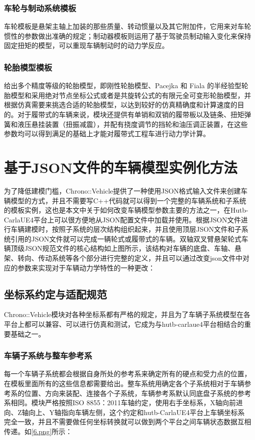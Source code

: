 \subsubsection{车轮与制动系统模板}

车轮模板是悬架主轴上加装的那些质量、转动惯量以及其它附加件，它用来对车轮惯性的参数做出准确的规定；制动器模板则运用了基于驾驶员制动输入变化来保持固定扭矩的模型，可以重现车辆制动时的动力学反应\cite{guo2025pid}。

\subsubsection{轮胎模型模板}

给出多个精度等级的轮胎模型，即刚性轮胎模型、Pacejka 和 Fiala 的半经验型轮胎模型和采用绝对节点坐标公式或者是共旋转公式的有限元全可变形轮胎模型，并根据仿真需要来挑选合适的轮胎模型，以达到较好的仿真精确度和计算速度的目的。对于履带式的车辆来说，模块还提供有单销和双销的履带板以及链条、扭矩弹簧和液压悬挂装置（扭振减震），并配有挠度调节的挡轮和油压调正装置，在这些参数均可以得到满足的基础上才能对履带式工程车进行动力学计算。

\section{基于JSON文件的车辆模型实例化方法}

为了降低建模门槛，Chrono::Vehicle提供了一种使用JSON格式输入文件来创建车辆模型的方式，并且不需要写C++代码就可以得到一个完整的车辆系统和子系统的模板实例，这也是本文中关于如何改变车辆模型参数主要的方法之一，在Hutb-CarlaUE4平台上可以很方便地从JSON配置文件中加载并使用。根据JSON文件进行车辆建模时，按照子系统的层次结构组织起来，并且使用顶层JSON文件和子系统引用的JSON文件就可以完成一辆轮式或履带式的车辆。双轴双叉臂悬架轮式车辆顶级JSON规范文件的核心结构如上图所示，该结构对车辆的底盘、车轴、悬架、转向、传动系统等各个部分进行完整的定义，并且可以通过改变json文件中对应的参数来实现对于车辆动力学特性的一种更改：

\subsection{坐标系约定与适配规范}

Chrono::Vehicle模块对各种坐标系都有严格的规定，并且为了车辆子系统模型在各平台上都可以兼容、可以进行仿真和测试，它成为与hutb-carlaue4平台相结合的重要基础之一。

\subsubsection{车辆子系统与整车参考系}
每一个车辆子系统都会根据自身所处的参考系来确定所有的硬点和受力点的位置，在模板里面所有的这些信息都需要给出。整车系统用确定各个子系统相对于车辆参考系的位置、方向来装配、连接各个子系统，车辆参考系默认同底盘子系统的参考系相同。模块严格按照ISO 8855：2011车轴约定，使用右手坐标系，X轴向前进向、Z轴向上、Y轴指向车辆左侧，这个约定和hutb-CarlaUE4平台上车辆坐标系完全一致，并且不需要做任何坐标转换就可以做到两个平台之间车辆状态数据互相传递\cite{zhang2025multiscene}。如\ref{6.png}所示：

